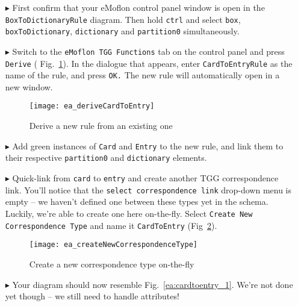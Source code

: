 \begin{enumerate}
  
\item[$\blacktriangleright$] First confirm that your eMoflon control panel window is open in the \texttt{Box\-To\-Dictionary\-Rule} diagram. Then hold
\texttt{ctrl} and select \texttt{box}, \texttt{box\-To\-Dictionary}, \texttt{dictionary} and \texttt{partition0} simultaneously.
  
\item[$\blacktriangleright$] Switch to the \texttt{eMoflon TGG Functions} tab on the control panel and press \texttt{Derive} (
Fig.~\ref{ea:derive_from_tgg_rule}). In the dialogue that appears, enter \texttt{Card\-To\-Ent\-ry\-Rule} as the name of the rule, and press \texttt{OK.} The
new rule will automatically open in a new window.

\begin{figure}[htbp]
\begin{center}
 \texttt{[image: ea\_deriveCardToEntry]}
  \caption{Derive a new rule from an existing one}
  \label{ea:derive_from_tgg_rule}
\end{center}
\end{figure}
\FloatBarrier

\item[$\blacktriangleright$] Add green instances of \texttt{Card} and \texttt{Entry} to the new rule, and link them to their respective \texttt{partition0} and
\texttt{dictionary} elements. 

\vspace{0.5cm}

\item[$\blacktriangleright$] Quick-link from \texttt{card} to \texttt{entry} and create another TGG correspondence link. You'll notice that the
\texttt{select correspondence link} drop-down menu is empty -- we haven't defined one between these types yet in the schema. Luckily, we're able to create one
here on-the-fly. Select \texttt{Create New Correspondence Type} and name it \texttt{CardToEntry} (Fig~\ref{ea:newCorrespondenceDialogue}). 

\vspace{0.5cm}

\begin{figure}[htbp]
\begin{center}
 \texttt{[image: ea\_createNewCorrespondenceType]}
  \caption{Create a new correspondence type on-the-fly}
  \label{ea:newCorrespondenceDialogue}
\end{center}
\end{figure}

\item[$\blacktriangleright$] Your diagram should now resemble Fig.~\ref{ea:cardtoentry_1}. We're not done yet though -- we still need to handle attributes!

\end{enumerate}

